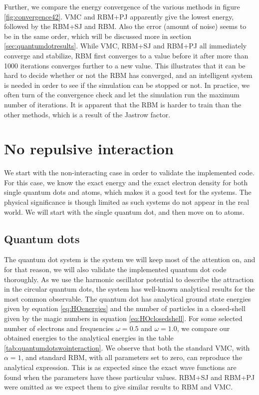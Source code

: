 Further, we compare the energy convergence of the various methods in figure \eqref{fig:convergence42}. VMC and RBM+PJ apparently give the lowest energy, followed by the RBM+SJ and RBM. Also the error (amount of noise) seems to be in the same order, which will be discussed more in section \ref{sec:quantumdotresults}. While VMC, RBM+SJ and RBM+PJ all immediately converge and stabilize, RBM first converges to a value before it after more than 1000 iterations converges further to a new value. This illustrates that it can be hard to decide whether or not the RBM has converged, and an intelligent system is needed in order to see if the simulation can be stopped or not. In practice, we often turn of the convergence check and let the simulation run the maximum number of iterations. It is apparent that the RBM is harder to train than the other methods, which is a result of the Jastrow factor.

\section{No repulsive interaction} \label{sec:norepulsive}
We start with the non-interacting case in order to validate the implemented code. For this case, we know the exact energy and the exact electron density for both single quantum dots and atoms, which makes it a good test for the systems. The physical significance is though limited as such systems do not appear in the real world. We will start with the single quantum dot, and then move on to atoms. 

\subsection{Quantum dots}
The quantum dot system is the system we will keep most of the attention on, and for that reason, we will also validate the implemented quantum dot code thoroughly. As we use the harmonic oscillator potential to describe the attraction in the circular quantum dots, the system has well-known analytical results for the most common observable. The quantum dot has analytical ground state energies given by equation \eqref{eq:HOenergies} and the number of particles in a closed-shell given by the magic numbers in equation \eqref{eq:HOclosedshell}. For some selected number of electrons and frequencies $\omega=0.5$ and $\omega=1.0$, we compare our obtained energies to the analytical energies in the table \eqref{tab:quantumdotswointeraction}. We observe that both the standard VMC, with $\alpha=1$, and standard RBM, with all parameters set to zero, can reproduce the analytical expression. This is as expected since the exact wave functions are found when the parameters have these particular values. RBM+SJ and RBM+PJ were omitted as we expect them to give similar results to RBM and VMC.

